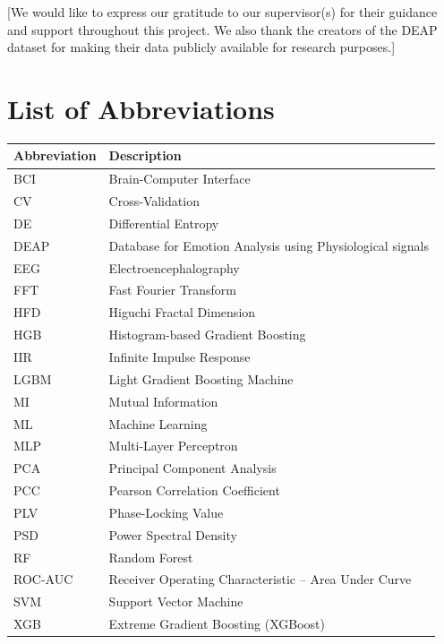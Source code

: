 \documentclass[12pt,a4paper]{report}
\begin{document}
[We would like to express our gratitude to our supervisor(s) for their guidance
and support throughout this project. We also thank the creators of the DEAP
dataset for making their data publicly available for research purposes.]

\newpage
\tableofcontents

\newpage
\listoffigures
{}

\newpage
\listoftables
{}

\newpage
\chapter*{List of Abbreviations}

\begin{longtable}{@{}ll@{}}
\toprule
\textbf{Abbreviation} & \textbf{Description} \\
\midrule
\endhead
BCI   & Brain-Computer Interface \\
CV    & Cross-Validation \\
DE    & Differential Entropy \\
DEAP  & Database for Emotion Analysis using Physiological signals \\
EEG   & Electroencephalography \\
FFT   & Fast Fourier Transform \\
HFD   & Higuchi Fractal Dimension \\
HGB   & Histogram-based Gradient Boosting \\
IIR   & Infinite Impulse Response \\
LGBM  & Light Gradient Boosting Machine \\
MI    & Mutual Information \\
ML    & Machine Learning \\
MLP   & Multi-Layer Perceptron \\
PCA   & Principal Component Analysis \\
PCC   & Pearson Correlation Coefficient \\
PLV   & Phase-Locking Value \\
PSD   & Power Spectral Density \\
RF    & Random Forest \\
ROC-AUC & Receiver Operating Characteristic -- Area Under Curve \\
SVM   & Support Vector Machine \\
XGB   & Extreme Gradient Boosting (XGBoost) \\
\bottomrule
\end{longtable}
\end{document}
